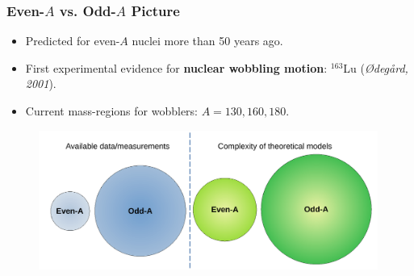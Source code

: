 \documentclass{beamer}
\begin{document}
\begin{frame}
	\frametitle{Even-$A$ vs. Odd-$A$ Picture}
	\begin{itemize}
		\item Predicted for even-$A$ nuclei more than 50 years ago.
		\item First experimental evidence for \textbf{nuclear wobbling motion}: $^{163}$Lu (\textit{Ødegård, 2001}).
		\item Current mass-regions for wobblers: $A=130,160,180$.
	\end{itemize}
	\begin{figure}
		\centering
		\includegraphics[width=0.99\textwidth]{figures/even-vs-odda.pdf}
	\end{figure}
\end{frame}



\end{document}
